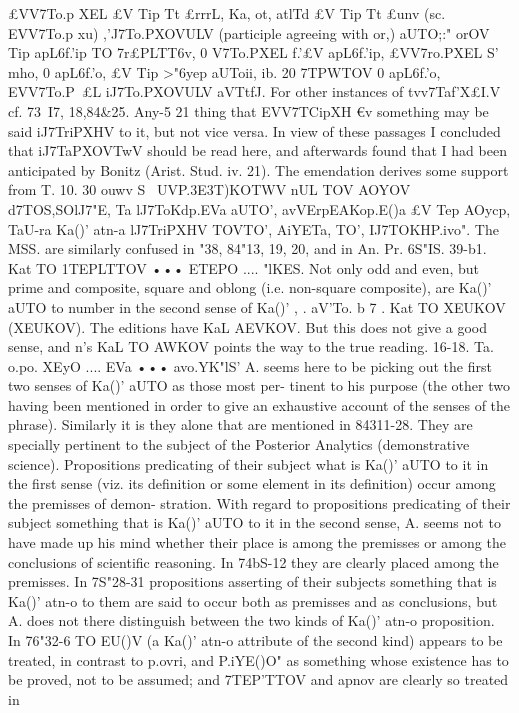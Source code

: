 {{{{£VV7To.p XEL £V Tip Tt £rrrL, Ka, ot, atlTd £V Tip Tt £unv (sc. EVV7To.p xu)
,'J7To.PXOVULV (participle agreeing with or,) aUTO;:" orOV Tip apL6f.'ip
TO 7r£PLTT6v, 0 V7To.PXEL f.'£V apL6f.'ip, £VV7ro.PXEL S' mho, 0 apL6f.'o,
£V Tip >"6yep aUToii, ib. 20 7TPWTOV 0 apL6f.'o, EVV7To.P~£L iJ7To.PXOVULV
aVTtfJ. For other instances of tvv7Taf'X£I.V cf. 73~I7, 18,84&25. Any-5 21
thing that EVV7TCipXH €v something may be said iJ7TriPXHV to it,
but not vice versa. In view of these passages I concluded that
iJ7TaPXOVTwV should be read here, and afterwards found that I had
been anticipated by Bonitz (Arist. Stud. iv. 21). The emendation
derives some support from T. 10. 30 ouwv S~ UVP.{3E{3T)KOTWV
nUL TOV AOYOV d7TOS,SOlJ7"E, Ta lJ7ToKdp.EVa aUTO', avVErpEAKop.E()a £V Tep
AOycp, TaU-ra Ka()' atn-a lJ7TriPXHV TOVTO', AiYETa, TO', IJ7TOKHP.ivo".
The MSS. are similarly confused in "38, 84"13, 19, 20, and in
An. Pr. 6S"IS.
39-b1. Kat TO 1TEPLTTOV ••• ETEPO .... "lKES. Not only odd and
even, but prime and composite, square and oblong (i.e. non-square
composite), are Ka()' aUTO to number in the second sense of Ka()'
,
.
aV'To.
b 7 . Kat TO XEUKOV (XEUKOV).
The editions have KaL AEVKOV.
But this does not give a good sense, and n's KaL TO AWKOV points
the way to the true reading.
16-18. Ta. o.po. XEyO .... EVa ••• avo.YK"lS' A. seems here to be
picking out the first two senses of Ka()' aUTO as those most per-
tinent to his purpose (the other two having been mentioned in
order to give an exhaustive account of the senses of the phrase).
Similarly it is they alone that are mentioned in 84311-28. They
are specially pertinent to the subject of the Posterior Analytics
(demonstrative science). Propositions predicating of their subject
what is Ka()' aUTO to it in the first sense (viz. its definition or some
element in its definition) occur among the premisses of demon-
stration. With regard to propositions predicating of their subject
something that is Ka()' aUTO to it in the second sense, A. seems not
to have made up his mind whether their place is among the
premisses or among the conclusions of scientific reasoning. In
74bS-12 they are clearly placed among the premisses. In 7S"28-31
propositions asserting of their subjects something that is Ka()' atn-o
to them are said to occur both as premisses and as conclusions,
but A. does not there distinguish between the two kinds of Ka()'
atn-o proposition. In 76"32-6 TO EU()V (a Ka()' atn-o attribute of the
second kind) appears to be treated, in contrast to p.ovri, and
P.iYE()O" as something whose existence has to be proved, not to
be assumed; and 7TEP'TTOV and apnov are clearly so treated in
}}}}}}
